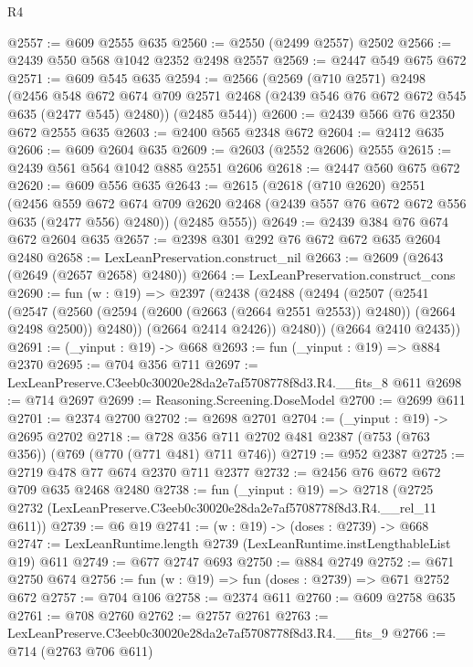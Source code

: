 \begin{lexlean}{R4}
\begin{coremodule}
@2557 := @609 @2555 @635
@2560 := @2550 (@2499 @2557) @2502
@2566 := @2439 @550 @568 @1042 @2352 @2498 @2557
@2569 := @2447 @549 @675 @672
@2571 := @609 @545 @635
@2594 := @2566
    (@2569
      (@710 @2571)
      @2498
      (@2456
        @548
        @672
        @674
        @709
        @2571
        @2468
        (@2439 @546 @76 @672 @672 @545 @635 (@2477 @545) @2480))
      (@2485 @544))
@2600 := @2439 @566 @76 @2350 @672 @2555 @635
@2603 := @2400 @565 @2348 @672
@2604 := @2412 @635
@2606 := @609 @2604 @635
@2609 := @2603 (@2552 @2606) @2555
@2615 := @2439 @561 @564 @1042 @885 @2551 @2606
@2618 := @2447 @560 @675 @672
@2620 := @609 @556 @635
@2643 := @2615
    (@2618
      (@710 @2620)
      @2551
      (@2456
        @559
        @672
        @674
        @709
        @2620
        @2468
        (@2439 @557 @76 @672 @672 @556 @635 (@2477 @556) @2480))
      (@2485 @555))
@2649 := @2439 @384 @76 @674 @672 @2604 @635
@2657 := @2398 @301 @292 @76 @672 @672 @635 @2604 @2480
@2658 := LexLeanPreservation.construct_nil
@2663 := @2609 (@2643 (@2649 (@2657 @2658) @2480))
@2664 := LexLeanPreservation.construct_cons
@2690 := fun (w : @19) =>
  @2397
    (@2438
      (@2488
        (@2494
          (@2507
            (@2541
              (@2547
                (@2560 (@2594 (@2600 (@2663 (@2664 @2551 @2553)) @2480)) (@2664 @2498 @2500))
                @2480))
            (@2664 @2414 @2426))
          @2480))
      (@2664 @2410 @2435))
@2691 := (_yinput : @19) -> @668
@2693 := fun (_yinput : @19) => @884 @2370
@2695 := @704 @356 @711
@2697 := LexLeanPreserve.C3eeb0c30020e28da2e7af5708778f8d3.R4.__fits_8 @611
@2698 := @714 @2697
@2699 := Reasoning.Screening.DoseModel
@2700 := @2699 @611
@2701 := @2374 @2700
@2702 := @2698 @2701
@2704 := (_yinput : @19) -> @2695 @2702
@2718 := @728 @356 @711 @2702 @481 @2387 (@753 (@763 @356)) (@769 (@770 (@771 @481) @711 @746))
@2719 := @952 @2387
@2725 := @2719 @478 @77 @674 @2370 @711 @2377
@2732 := @2456 @76 @672 @672 @709 @635 @2468 @2480
@2738 := fun (_yinput : @19) =>
  @2718 (@2725 @2732 (LexLeanPreserve.C3eeb0c30020e28da2e7af5708778f8d3.R4.__rel_11 @611))
@2739 := @6 @19
@2741 := (w : @19) -> (doses : @2739) -> @668
@2747 := LexLeanRuntime.length @2739 (LexLeanRuntime.instLengthableList @19) @611
@2749 := @677 @2747 @693
@2750 := @884 @2749
@2752 := @671 @2750 @674
@2756 := fun (w : @19) => fun (doses : @2739) => @671 @2752 @672
@2757 := @704 @106
@2758 := @2374 @611
@2760 := @609 @2758 @635
@2761 := @708 @2760
@2762 := @2757 @2761
@2763 := LexLeanPreserve.C3eeb0c30020e28da2e7af5708778f8d3.R4.__fits_9
@2766 := @714 (@2763 @706 @611)

\end{coremodule}
\end{lexlean}
